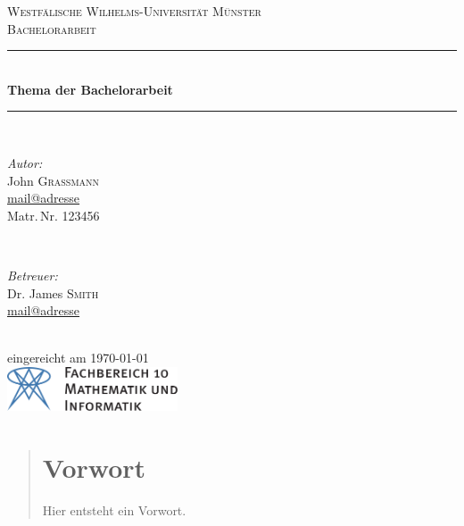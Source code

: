 


\begin{titlepage}
	\newcommand{\HRule}{\rule{\linewidth}{0.5mm}} %

	\center %
 

	\textsc{\LARGE Westfälische Wilhelms-Universität Münster}\\[1.5cm] %
	\textsc{\Large Bachelorarbeit}\\[0.5cm] %


	\HRule \\[0.4cm]
	{ \huge \sffamily\bfseries Thema der Bachelorarbeit}\\[0.4cm] %
	\HRule \\[1.5cm]
 

	\begin{minipage}{0.4\textwidth}
	\begin{flushleft} \large
	\emph{Autor:}\\
	John \textsc{Graßmann}\\ %
	\normalsize \url{mail@adresse}\\
	Matr.\,Nr. 123456
	\end{flushleft}
	\end{minipage}
	~
	\begin{minipage}{0.4\textwidth}
	\begin{flushright} \large
	\emph{Betreuer:} \\
	Dr. James \textsc{Smith}\\ %
	\normalsize \url{mail@adresse}
	\end{flushright}
	\end{minipage}\\[4cm]

	{\large eingereicht am \today}\\[3cm] %


	\includegraphics[height=1.3cm,keepaspectratio]{Bilder/fb10logo.pdf}\\[1cm] %
 

	\vfill %
	
\end{titlepage}
\begin{abstract}
\section*{Vorwort}
Hier entsteht ein Vorwort.
\end{abstract}
\tableofcontents
\cleardoubleoddemptypage
{}
\setcounter{page}{1}

